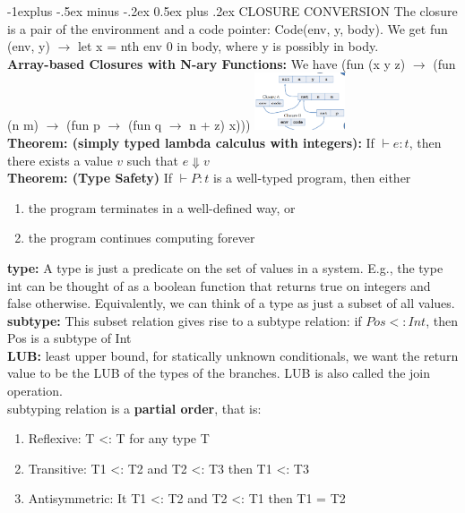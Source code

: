 \documentclass[10pt,landscape]{article}
\makeatletter
\renewcommand{\subsection}{\@startsection{subsection}{2}{0mm}%
                                {-1explus -.5ex minus -.2ex}%
                                {0.5ex plus .2ex}%
                                {\normalfont\normalsize\bfseries}}
\makeatother
\begin{document}
\begin{multicols}{3}
\subsection{CLOSURE CONVERSION}
The closure is a pair of the environment and a code pointer: Code(env, y, body). We get 
fun (env, y) $\rightarrow$ let x = nth env 0 in body, where y is possibly in body.\\
\textbf{Array-based Closures with N-ary Functions:} 
We have (fun (x y z) $\rightarrow$ (fun (n m) $\rightarrow$ (fun p $\rightarrow$ (fun q $\rightarrow$ n + z) x)))
\includegraphics[width = 0.2\textwidth]{assets/closure_array_based.png}\\
\textbf{Theorem: (simply typed lambda calculus with integers):} If $\vdash e : t$, then there exists a value $v$ such that $e \Downarrow v$ \\
\textbf{Theorem: (Type Safety)} If $\vdash P : t$ is a well-typed program, then either
\begin{enumerate}
  \item the program terminates in a well-defined way, or
  \item the program continues computing forever
\end{enumerate}
\textbf{type:} A type is just a predicate on the set of values in a system. E.g., the type int can be thought of as a boolean function that returns
true on integers and false otherwise. Equivalently, we can think of a type as just a subset of all values.\\
\textbf{subtype:} This subset relation gives rise to a subtype relation: if $Pos <: Int$, then Pos is a subtype of Int \\
\textbf{LUB:} least upper bound, for statically unknown conditionals, we want the return value to be
the LUB of the types of the branches. LUB is also called the join operation. \\
subtyping relation is a \textbf{partial order}, that is:
\begin{enumerate}
  \item Reflexive: T <: T for any type T
  \item Transitive: T1 <: T2 and T2 <: T3 then T1 <: T3
  \item Antisymmetric: It T1 <: T2 and T2 <: T1 then T1 = T2
\end{enumerate}

\end{multicols}
\end{document}
